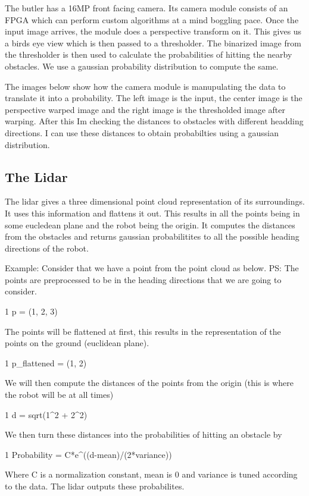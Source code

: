 The butler has a 16\+MP front facing camera. Its camera module consists of an F\+P\+GA which can perform custom algorithms at a mind boggling pace. Once the input image arrives, the module does a perspective transform on it. This gives us a birds eye view which is then passed to a thresholder. The binarized image from the thresholder is then used to calculate the probabilities of hitting the nearby obstacles. We use a gaussian probability distribution to compute the same.

The images below show how the camera module is manupulating the data to translate it into a probability. The left image is the input, the center image is the perspective warped image and the right image is the thresholded image after warping. After this I\textquotesingle{}m checking the distances to obstacles with different headding directions. I can use these distances to obtain probabilties using a gaussian distribution. 

   

\subsection*{The Lidar}

The lidar gives a three dimensional point cloud representation of its surroundings. It uses this information and \textquotesingle{}flattens\textquotesingle{} it out. This results in all the points being in some eucledean plane and the robot being the origin. It computes the distances from the obstacles and returns gaussian probabilitites to all the possible heading directions of the robot.

Example\+: Consider that we have a point from the point cloud as below. PS\+: The points are preprocessed to be in the heading directions that we are going to consider. 
\begin{DoxyCode}
1 p = (1, 2, 3)
\end{DoxyCode}
 The points will be flattened at first, this results in the representation of the points on the ground (euclidean plane). 
\begin{DoxyCode}
1 p\_flattened = (1, 2)
\end{DoxyCode}
 We will then compute the distances of the points from the origin (this is where the robot will be at all times) 
\begin{DoxyCode}
1 d = sqrt(1^2 + 2^2)
\end{DoxyCode}
 We then turn these distances into the probabilities of hitting an obstacle by 
\begin{DoxyCode}
1 Probability = C*e^((d-mean)/(2*variance))
\end{DoxyCode}
 Where C is a normalization constant, mean is 0 and variance is tuned according to the data. The lidar outputs these probabilites.

